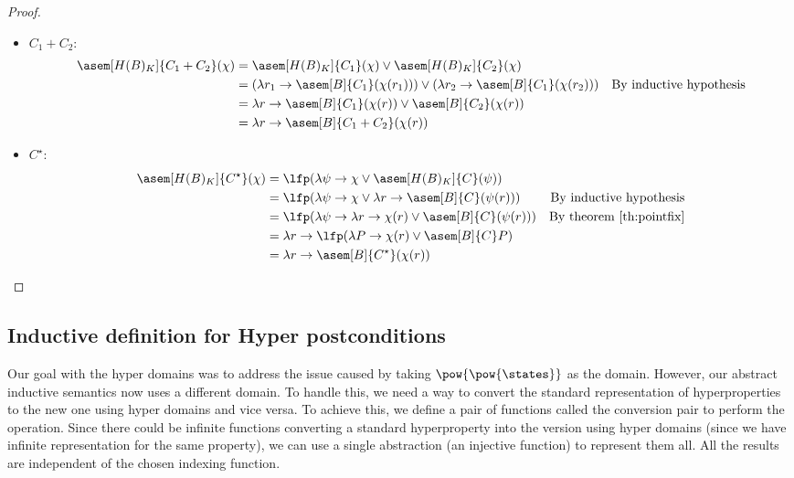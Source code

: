 \begin{proof}
\begin{itemize}
    \item $C_1 + C_2$:
      \begin{align*}
        \asem[H(B)_K]{C_1 + C_2}(\chi)
          &= \asem[H(B)_K]{C_1}(\chi) 
            \lor \asem[H(B)_K]{C_2}(\chi) \\
          &= (\lambda r_1 \to \asem[B]{C_1}(\chi(r_1)))
            \lor (\lambda r_2 \to \asem[B]{C_1}(\chi(r_2)))
          &\text{By inductive hypothesis} \\
          &= \lambda r \to \asem[B]{C_1}(\chi(r))
            \lor \asem[B]{C_2}(\chi(r)) \\
          &= \lambda r \to \asem[B]{C_1 + C_2}(\chi(r))
      \end{align*}

    \item $C^\star$:
      \begin{align*}
        \asem[H(B)_K]{C^\star}(\chi)
          &= \lfp(\lambda \psi \to 
            \chi \lor \asem[H(B)_K]{C}(\psi)) \\
          &= \lfp(\lambda \psi \to 
            \chi \lor \lambda r \to \asem[B]{C}(\psi(r)))
          &\text{By inductive hypothesis} \\
          &= \lfp(\lambda \psi \to \lambda r \to
            \chi(r) \lor \asem[B]{C}(\psi(r)))
          &\text{By theorem \ref{th:pointfix}} \\
          &= \lambda r \to \lfp(\lambda P 
            \to \chi(r) \lor \asem[B]{C} P) \\
          &= \lambda r \to \asem[B]{C^\star}(\chi(r))
      \end{align*}
  \end{itemize}
\end{proof}


\subsection{Inductive definition for Hyper postconditions}

Our goal with the hyper domains was to address the issue caused by taking 
$\pow{\pow{\states}}$ as the domain. However, our abstract inductive semantics 
now uses a different domain. To handle this, we need a way to convert the 
standard representation of hyperproperties to the new one using hyper domains 
and vice versa. To achieve this, we define a pair of functions called the 
conversion pair to perform the operation. Since there could be infinite 
functions converting a standard hyperproperty into the version using hyper 
domains (since we have infinite representation for the same property), we can 
use a single abstraction (an injective function) to represent them all. 
All the results are independent of the chosen indexing function.

